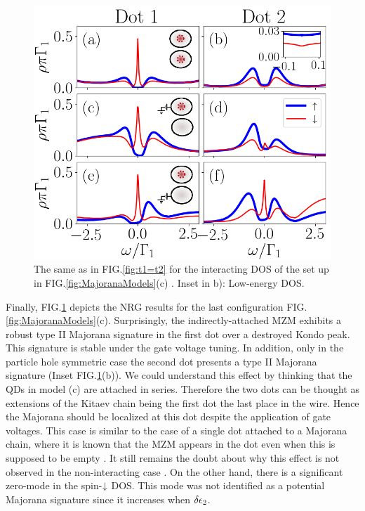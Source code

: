 \documentclass[showpacs,aps,prb,reprint,superscriptaddress]{revtex4-1}
\begin{document}
\begin{figure}[bt]
\begin{center}
\includegraphics[scale=0.45]{Graficos/b)Nt2>0.png}
\caption{  \label{fig:Nt2>0} The same as in FIG.\ref{fig:t1=t2} for the interacting DOS of the set up in FIG.\ref{fig:MajoranaModels}(c) . Inset in b): Low-energy DOS. 
}
%

\end{center}
\end{figure}

    Finally, FIG.\ref{fig:Nt2>0} depicts the NRG results for the last configuration FIG.\ref{fig:MajoranaModels}(c). Surprisingly, the indirectly-attached MZM exhibits a robust type II Majorana signature in the first dot over a destroyed Kondo peak. This signature is stable under the gate voltage tuning. In addition, only  in the particle hole symmetric case the second dot presents a type II Majorana signature (Inset FIG.\ref{fig:Nt2>0}(b)). We could understand this effect by thinking that the QDs in model (c) are attached in series. Therefore the two dots can be thought as extensions of the Kitaev chain being the first dot  the last place in the wire. Hence the Majorana should be localized at this dot despite the application of gate voltages. This case is similar to the case of a single dot attached to a Majorana chain, where it is known that the MZM appears in the dot even when this is supposed to be empty \cite{vernek_subtle_2014}. It still remains the doubt about why this effect is not observed in the non-interacting case . On the other hand, there is a significant zero-mode in the spin-$\downarrow$ DOS. This mode was not identified as a potential Majorana signature since it increases when $\delta \epsilon_2$. 
\end{document}

